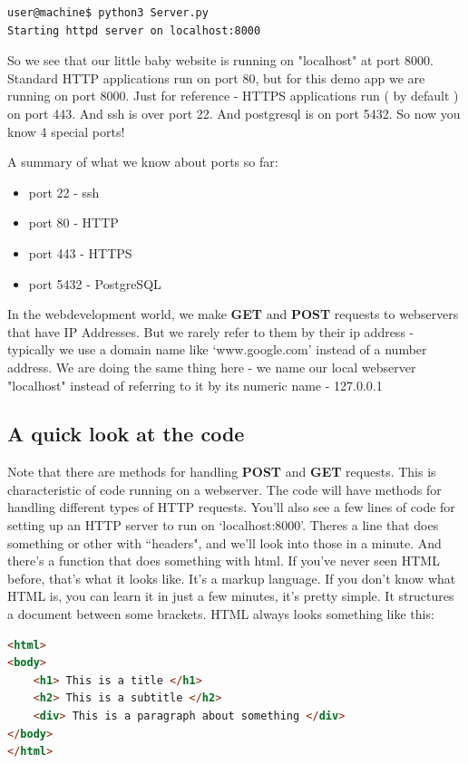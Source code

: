 \documentclass[10pt]{article}
\begin{document}
\begin{lstlisting}
user@machine$ python3 Server.py
Starting httpd server on localhost:8000
\end{lstlisting}

So we see that our little baby website is running on "localhost" at port 8000. Standard HTTP applications run on port 80, but for this demo app we are running on port 8000. Just for reference - HTTPS applications run ( by default ) on port 443. And ssh is over port 22. And postgresql is on port 5432. So now you know 4 special ports!

A summary of what we know about ports so far:
\begin{itemize}
\item port 22 - ssh
\item port 80 - HTTP
\item port 443 - HTTPS
\item port 5432 - PostgreSQL
\end{itemize}

In the webdevelopment world, we make \textbf{GET} and \textbf{POST} requests to webservers that have IP Addresses. But we rarely refer to them by their ip address - typically we use a domain name like `www.google.com' instead of a number address. We are doing the same thing here - we name our local webserver "localhost" instead of referring to it by its numeric name - 127.0.0.1 

\subsection{A quick look at the code}

Note that there are methods for handling \textbf{POST} and \textbf{GET} requests. This is characteristic of code running on a webserver. The code will have methods for handling different types of HTTP requests. You'll also see a few lines of code for setting up an HTTP server to run on `localhost:8000'. Theres a line that does something or other with ``headers", and we'll look into those in a minute. And there's a function that does something with html. If you've never seen HTML before, that's what it looks like. It's a markup language. If you don't know what HTML is, you can learn it in just a few minutes, it's pretty simple. It structures a document between some brackets. HTML always looks something like this:

\begin{lstlisting}[language=HTML]
<html>
<body>
	<h1> This is a title </h1>
	<h2> This is a subtitle </h2>
	<div> This is a paragraph about something </div>
</body>
</html>
\end{lstlisting}
\end{document}
